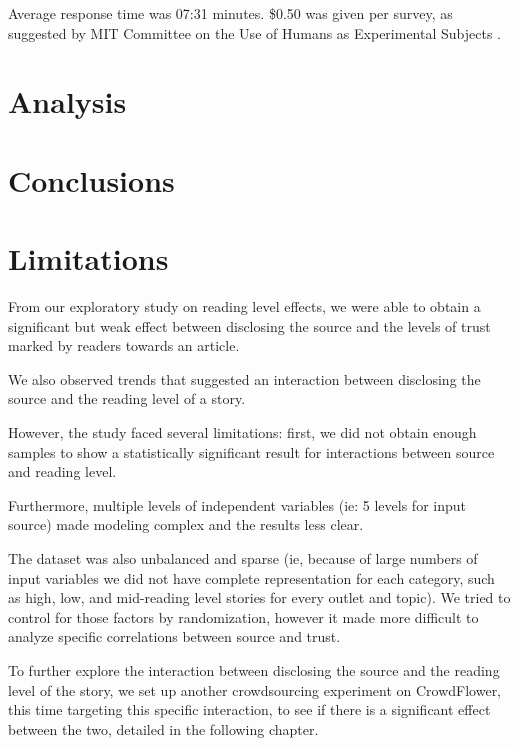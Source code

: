 Average response time was 07:31 minutes.
\$0.50 was given per survey, as suggested by MIT Committee on the Use of Humans as Experimental Subjects \cite{COUHES-turk}.
\section{Analysis}
\section{Conclusions}

\section{Limitations}

From our exploratory study on reading level effects, we were able to obtain a significant but weak effect between disclosing the source and the levels of trust marked by readers towards an article.

We also observed trends that suggested an interaction between disclosing the source and the reading level of a story.

However, the study faced several limitations: first, we did not obtain enough samples to show a statistically significant result for interactions between source and reading level.

Furthermore, multiple levels of independent variables (ie: 5 levels for input source) made modeling complex and the results less clear.

The dataset was also unbalanced and sparse (ie, because of large numbers of input variables we did not have complete representation for each category, such as high, low, and mid-reading level stories for every outlet and topic). We tried to control for those factors by randomization, however it made more difficult to analyze specific correlations between source and trust.

To further explore the interaction between disclosing the source and the reading level of the story, we set up another crowdsourcing experiment on CrowdFlower, this time targeting this specific interaction, to see if there is a significant effect between the two, detailed in the following chapter.
